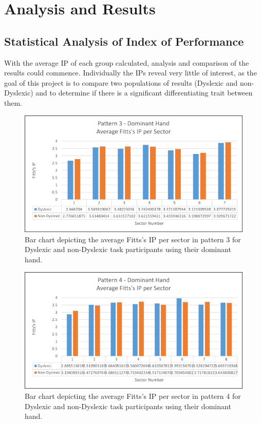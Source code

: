 \section{Analysis and Results}
	\subsection{Statistical Analysis of Index of Performance}
		With the average IP of each group calculated, analysis and comparison of the results could  commence. Individually the IPs reveal very little of interest, as the goal of this project is to compare two populations of results (Dyslexic and non-Dyslexic) and to determine if there is a significant differentiating trait between them.
		
	\begin{figure}[]
		\centering
		\includegraphics[width = \textwidth]{../images/pat_3_ip_dom}
		\caption{Bar chart depicting the average Fitts's IP per sector in pattern 3 for Dyslexic and non-Dyslexic task participants using their dominant hand.}
		\label{fi_pat_3_ip_dom}
	\end{figure}		

	\begin{figure}[]
		\centering
		\includegraphics[width = \textwidth]{../images/pat_4_ip_dom}
		\caption{Bar chart depicting the average Fitts's IP per sector in pattern 4 for Dyslexic and non-Dyslexic task participants using their dominant hand.}
		\label{fi_pat_4_ip_dom}
	\end{figure}

